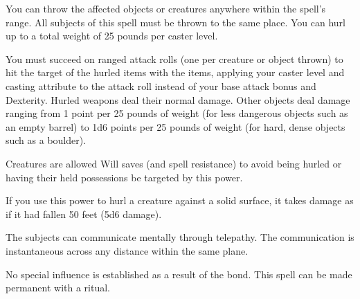 \spellrng{\rngmed}
\begin{spelleffect}
  You can throw the affected objects or creatures anywhere within the spell's range. All subjects of this spell must be thrown to the same place. You can hurl up to a total weight of 25 pounds per caster level.
  \par You must succeed on ranged attack rolls (one per creature or object thrown) to hit the target of the hurled items with the items, applying your caster level and casting attribute to the attack roll instead of your base attack bonus and Dexterity. Hurled weapons deal their normal damage. Other objects deal damage ranging from 1 point per 25 pounds of weight (for less dangerous objects such as an empty barrel) to 1d6 points per 25 pounds of weight (for hard, dense objects such as a boulder).
  \par Creatures are allowed Will saves (and spell resistance) to avoid being hurled or having their held possessions be targeted by this power.
  \par If you use this power to hurl a creature against a solid surface, it takes damage as if it had fallen 50 feet (5d6 damage).
\end{spelleffect}

\spellrng{\rngclose}
\begin{spelleffect}
  The subjects can communicate mentally through telepathy. The communication is instantaneous across any distance within the same plane.
\end{spelleffect}
\begin{spellnotes}
  No special influence is established as a result of the bond. This spell can be made permanent with a  ritual.
\end{spellnotes}

